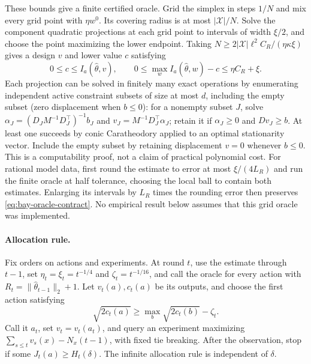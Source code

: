 \documentclass{article}
\theoremstyle{plain}
\theoremstyle{definition}
\begin{document}
These bounds give a finite certified oracle.  Grid the simplex in steps
$1/N$ and mix every grid point with $\eta w^0$.  Its covering radius is
at most $|\mathcal X|/N$.  Solve the component quadratic projections
at each grid point to intervals of width $\xi/2$, and choose the point
maximizing the lower endpoint.  Taking
$N\ge2|\mathcal X|\ell^2C_R/(\eta\kappa\xi)$ gives a design $v$ and
lower value $c$ satisfying
\begin{equation}
 0\le c\le I_a(\widehat\theta,v),\qquad
 0\le\max_wI_a(\widehat\theta,w)-c\le\eta C_R+\xi.
 \label{eq:bay-oracle-contract}
\end{equation}
Each projection can be solved in finitely many exact operations by
enumerating independent active constraint subsets of size at most $d$,
including the empty subset (zero displacement when $b\le0$):
for a nonempty subset $J$, solve
$\alpha_J=(D_JM^{-1}D_J^\top)^{-1}b_J$ and
$v_J=M^{-1}D_J^\top\alpha_J$; retain it if
$\alpha_J\ge0$ and $Dv_J\ge b$.  At least one succeeds by conic
Caratheodory applied to an optimal stationarity vector.  Include the empty
subset by retaining displacement $v=0$ whenever $b\le0$.  This is a
computability proof, not a claim of practical polynomial cost.  For
rational model data, first round the estimate to error at most
$\xi/(4L_R)$ and run the finite oracle at half tolerance, choosing the
local ball to contain both estimates.  Enlarging its intervals by $L_R$
times the rounding error then preserves \cref{eq:bay-oracle-contract}.  No empirical result below assumes that this grid oracle
was implemented.

\paragraph{Allocation rule.}
Fix orders on actions and experiments.  At round $t$, use the estimate
through $t-1$, set $\eta_t=\xi_t=t^{-1/4}$ and
$\zeta_t=t^{-1/16}$, and call the oracle for every action with
$R_t=\|\widehat\theta_{t-1}\|_2+1$.
Let $v_t(a),c_t(a)$ be its outputs, and choose the first action satisfying
\[
 \sqrt{2c_t(a)}\ge\max_b\sqrt{2c_t(b)}-\zeta_t.
\]
Call it $a_t$, set $v_t=v_t(a_t)$, and query an experiment maximizing
$\sum_{s\le t}v_s(x)-N_x(t-1)$, with fixed tie breaking.
After the observation, stop if some $J_t(a)\ge H_t(\delta)$.
The infinite allocation rule is independent of $\delta$.
\end{document}
